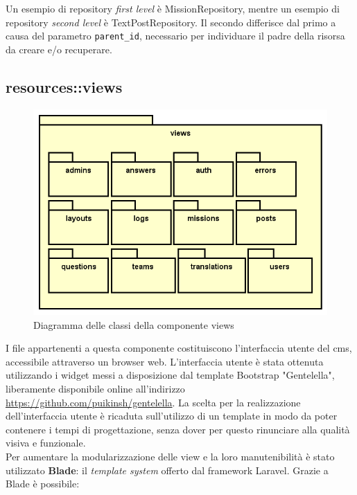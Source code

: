 Un esempio di repository \textit{first level} è MissionRepository, mentre un esempio di repository \textit{second level} è TextPostRepository. Il secondo differisce dal primo a causa del parametro \verb!parent_id!, necessario per individuare il padre della risorsa da creare e/o recuperare.

\subsection{resources::views} %

\begin{figure}[H]
	\centering
  \includegraphics[scale=0.7]{immagini/components/views_diagram.png}
  \caption{Diagramma delle classi della componente views}
	\label{fig:views} 
\end{figure}

I file appartenenti a questa componente costituiscono l'interfaccia utente del \gls{cms}\glsfirstoccur{}, accessibile attraverso un browser web. L'interfaccia utente è stata ottenuta utilizzando i widget messi a disposizione dal template Bootstrap "Gentelella", liberamente disponibile online all'indirizzo \url{https://github.com/puikinsh/gentelella}. La scelta per la realizzazione dell'interfaccia utente è ricaduta sull'utilizzo di un template in modo da poter contenere i tempi di progettazione, senza dover per questo rinunciare alla qualità visiva e funzionale.\\

Per aumentare la modularizzazione delle view e la loro manutenibilità è stato utilizzato \textbf{Blade}: il \textit{template system} offerto dal framework Laravel. Grazie a Blade è possibile: 

